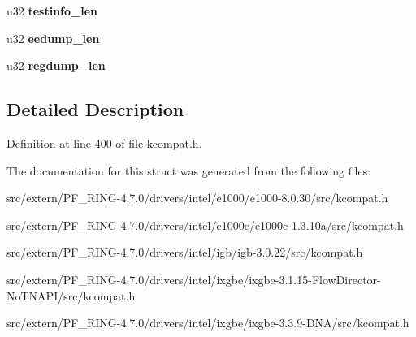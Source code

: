 \begin{DoxyCompactItemize}
\item 
\hypertarget{structk__ethtool__drvinfo_af202cc80cd1db9b898fc30a0ddd419b2}{
u32 {\bfseries testinfo\_\-len}}
\label{structk__ethtool__drvinfo_af202cc80cd1db9b898fc30a0ddd419b2}

\item 
\hypertarget{structk__ethtool__drvinfo_a067ba2d513dc39efe51cec7a2f24062e}{
u32 {\bfseries eedump\_\-len}}
\label{structk__ethtool__drvinfo_a067ba2d513dc39efe51cec7a2f24062e}

\item 
\hypertarget{structk__ethtool__drvinfo_ac5b033c77b5e567d316f01060afd3b66}{
u32 {\bfseries regdump\_\-len}}
\label{structk__ethtool__drvinfo_ac5b033c77b5e567d316f01060afd3b66}

\end{DoxyCompactItemize}


\subsection{Detailed Description}


Definition at line 400 of file kcompat.h.



The documentation for this struct was generated from the following files:\begin{DoxyCompactItemize}
\item 
src/extern/PF\_\-RING-\/4.7.0/drivers/intel/e1000/e1000-\/8.0.30/src/kcompat.h\item 
src/extern/PF\_\-RING-\/4.7.0/drivers/intel/e1000e/e1000e-\/1.3.10a/src/kcompat.h\item 
src/extern/PF\_\-RING-\/4.7.0/drivers/intel/igb/igb-\/3.0.22/src/kcompat.h\item 
src/extern/PF\_\-RING-\/4.7.0/drivers/intel/ixgbe/ixgbe-\/3.1.15-\/FlowDirector-\/NoTNAPI/src/kcompat.h\item 
src/extern/PF\_\-RING-\/4.7.0/drivers/intel/ixgbe/ixgbe-\/3.3.9-\/DNA/src/kcompat.h\end{DoxyCompactItemize}
